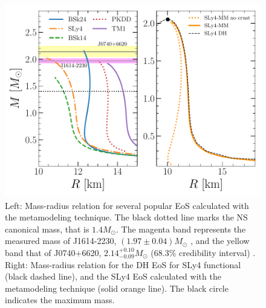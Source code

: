 \begin{figure}[!t]
\begin{center}
  \includegraphics[width=0.9\linewidth]{figures/mr_popular.pdf}
\end{center}
\caption[Mass-radius relation for several popular EoS]{Left: Mass-radius 
  relation for several popular EoS calculated
  with the metamodeling technique. The black dotted line marks the NS 
canonical mass, that is $1.4M_\odot$. The magenta band represents the measured 
mass of J1614-2230, $(1.97 \pm 0.04)M_\odot$ \cite{Demorest2010}, and the 
yellow band that of J0740+6620, $2.14_{-0.09}^{+0.10}M_\odot$ ($68.3\%$ 
credibility interval) \cite{Cromartie2020}.
Right: Mass-radius relation for the DH EoS for SLy4 functional (black dashed
line), and the SLy4 EoS calculated with the metamodeling technique (solid
orange line). The black circle indicates the maximum 
mass.}\label{fig:mr_popular}
\end{figure}
 
